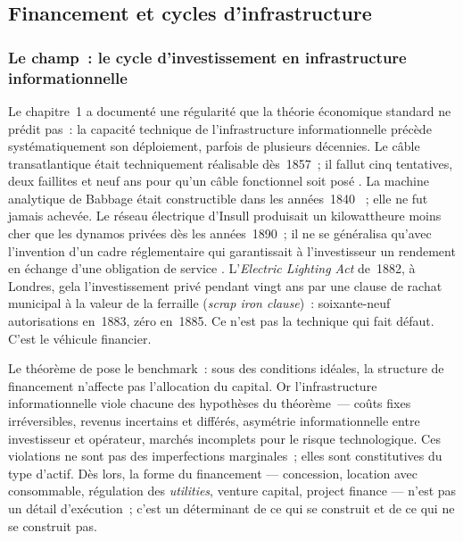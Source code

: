

\subsection{Financement et cycles d'infrastructure}\label{sec:d8-finance}

\subsubsection{Le champ~: le cycle d'investissement en infrastructure informationnelle}

Le chapitre~1 a documenté une régularité que la théorie économique standard ne prédit pas~: la capacité technique de l'infrastructure informationnelle précède systématiquement son déploiement, parfois de plusieurs décennies. Le câble transatlantique était techniquement réalisable dès~1857~; il fallut cinq tentatives, deux faillites et neuf ans pour qu'un câble fonctionnel soit posé \parencite{gordon_thread_2002}. La machine analytique de Babbage était constructible dans les années~1840 \parencite{swade_difference_2001}~; elle ne fut jamais achevée. Le réseau électrique d'Insull produisait un kilowattheure moins cher que les dynamos privées dès les années~1890~; il ne se généralisa qu'avec l'invention d'un cadre réglementaire qui garantissait à l'investisseur un rendement en échange d'une obligation de service \parencite{hughes_networks_1983}. L'\emph{Electric Lighting Act} de~1882, à Londres, gela l'investissement privé pendant vingt ans par une clause de rachat municipal à la valeur de la ferraille (\emph{scrap iron clause})~: soixante-neuf autorisations en~1883, zéro en~1885. Ce n'est pas la technique qui fait défaut. C'est le véhicule financier.

\markNEO Le théorème de \textcite{modigliani_cost_1958} pose le benchmark~: sous des conditions idéales, la structure de financement n'affecte pas l'allocation du capital.  Or l'infrastructure informationnelle viole chacune des hypothèses du théorème~--- coûts fixes irréversibles, revenus incertains et différés, asymétrie informationnelle entre investisseur et opérateur, marchés incomplets pour le risque technologique. Ces violations ne sont pas des imperfections marginales~; elles sont constitutives du type d'actif. Dès lors, la forme du financement --- concession, location avec consommable, régulation des \emph{utilities}, venture capital, project finance --- n'est pas un détail d'exécution~; c'est un déterminant de ce qui se construit et de ce qui ne se construit pas.

